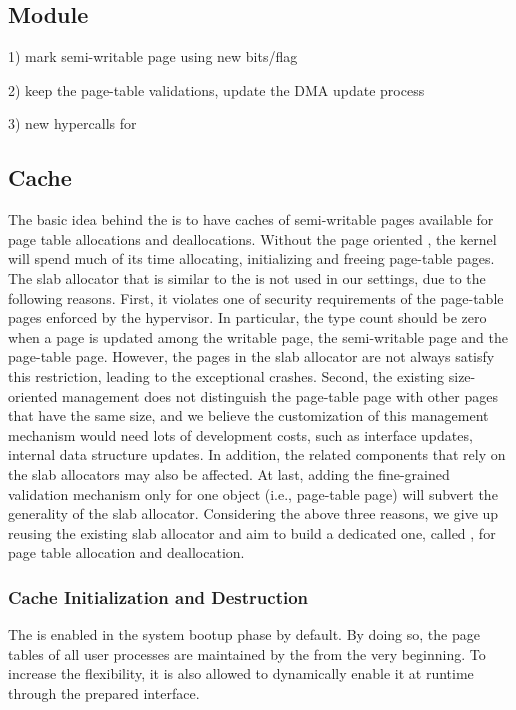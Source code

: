 \subsection{\name Module}\label{sec:module}
1) mark semi-writable page using new bits/flag

2) keep the page-table validations, update the DMA update process

3) new hypercalls for \cache

\subsection{\name Cache}\label{sec:cache}
The basic idea behind the \cache is to have caches of semi-writable pages available for page table allocations and deallocations.
Without the page oriented \cache, the kernel will spend much of its time allocating, initializing and freeing page-table pages.
The slab allocator that is similar to the \cache is not used in our settings, due to the following reasons.
First, it violates one of security requirements of the page-table pages enforced by the hypervisor.
In particular, the type count should be zero when a page is updated among the writable page, the semi-writable page and the page-table page.
However, the pages in the slab allocator are not always satisfy this restriction, leading to the exceptional crashes.
Second, the existing size-oriented management does not distinguish the page-table page with other pages that have the same size, and we believe the customization of this management mechanism would need lots of development costs, such as interface updates, internal data structure updates.
In addition, the related components that rely on the slab allocators may also be affected.
At last, adding the fine-grained validation mechanism only for one object (i.e., page-table page) will subvert the generality of the slab allocator.
Considering the above three reasons, we give up reusing the existing slab allocator and aim to build a dedicated one, called \cache, for page table allocation and deallocation.

\subsubsection{\name Cache Initialization and Destruction}
The \cache is enabled in the system bootup phase by default.
By doing so, the page tables of all user processes are maintained by the \cache from the very beginning.
To increase the flexibility, it is also allowed to dynamically enable it at runtime through the prepared interface.

